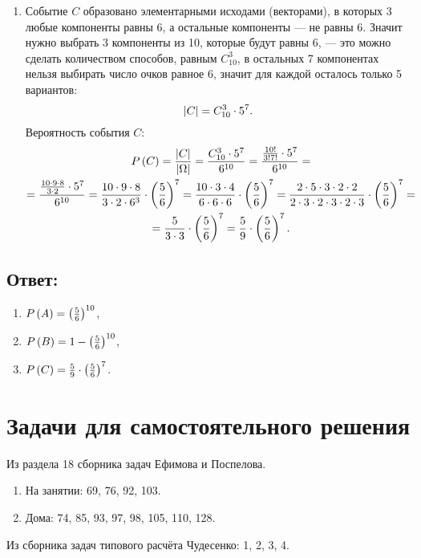 \begin{enumerate}
    \item
    Событие $C$ образовано элементарными исходами (векторами), в которых 3 любые компоненты равны 6, а остальные компоненты ---
    не равны 6. Значит нужно выбрать 3 компоненты из 10, которые будут равны 6, --- это можно сделать количеством способов, равным $C_{10}^3$,
    в остальных 7 компонентах нельзя выбирать число очков равное 6, значит для каждой осталось только 5 вариантов:
    \begin{equation}
        \left | C \right | = C_{10}^3 \cdot 5^7 .
    \end{equation}
    Вероятность события $C$:
    \begin{multline}
        P \left ( C \right )
        = \frac{\left | C \right |}{\left | \Omega \right |}
        = \frac{C_{10}^3 \cdot 5^7}{6^{10}}
        = \frac{\frac{10!}{3!7!} \cdot 5^7}{6^{10}} = \\
        = \frac{\frac{10 \cdot 9 \cdot 8}{3 \cdot 2}  \cdot 5^7}{6^{10}}
        = \frac{10 \cdot 9 \cdot 8}{3 \cdot 2 \cdot 6^3} \cdot \left ( \frac{5}{6} \right )^7
        = \frac{10 \cdot 3 \cdot 4}{6 \cdot 6 \cdot 6} \cdot \left ( \frac{5}{6} \right )^7
        = \frac{2 \cdot 5 \cdot 3 \cdot 2 \cdot 2}{2 \cdot 3 \cdot 2 \cdot 3 \cdot 2 \cdot 3} \cdot \left ( \frac{5}{6} \right )^7 = \\
        = \frac{5}{3 \cdot 3} \cdot \left ( \frac{5}{6} \right )^7
        = \frac{5}{9} \cdot \left ( \frac{5}{6} \right )^7 .
    \end{multline}
\end{enumerate}

\subsection*{Ответ:}
\begin{enumerate}
    \item $P \left ( A \right ) = \left ( \frac{5}{6} \right )^{10}$,
    \item $P \left ( B \right ) = 1 - \left ( \frac{5}{6} \right )^{10}$,
    \item $P \left ( C \right ) = \frac{5}{9} \cdot \left ( \frac{5}{6} \right )^7$.
\end{enumerate}

\section*{Задачи для самостоятельного решения}

Из раздела 18 сборника задач Ефимова и Поспелова.
\begin{enumerate}
    \item На занятии: 69, 76, 92, 103.
    \item Дома: 74, 85, 93, 97, 98, 105, 110, 128.
\end{enumerate}

Из сборника задач типового расчёта Чудесенко: 1, 2, 3, 4.